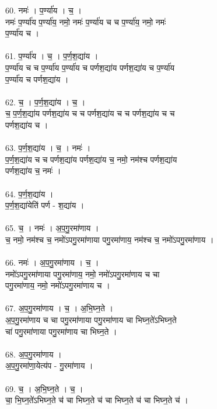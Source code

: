 60. नमः॑ । प॒र्ण्या॑य । च॒ ।\\
नमः॑ प॒र्ण्या॑य प॒र्ण्या॑य॒ नमो॒ नमः॑ प॒र्ण्या॑य च च प॒र्ण्या॑य॒ नमो॒ नमः॑\\
प॒र्ण्या॑य च ।\\
\\
61. प॒र्ण्या॑य । च॒ । प॒र्ण॒श॒द्या॑य ।\\
प॒र्ण्या॑य च च प॒र्ण्या॑य प॒र्ण्या॑य च पर्णश॒द्या॑य पर्णश॒द्या॑य च प॒र्ण्या॑य\\
प॒र्ण्या॑य च पर्णश॒द्या॑य ।\\
\\
62. च॒ । प॒र्ण॒श॒द्या॑य । च॒ ।\\
च॒ प॒र्ण॒श॒द्या॑य पर्णश॒द्या॑य च च पर्णश॒द्या॑य च च पर्णश॒द्या॑य च च\\
पर्णश॒द्या॑य च ।\\
\\
63. प॒र्ण॒श॒द्या॑य । च॒ । नमः॑ ।\\
प॒र्ण॒श॒द्या॑य च च पर्णश॒द्या॑य पर्णश॒द्या॑य च॒ नमो॒ नम॑श्च पर्णश॒द्या॑य\\
पर्णश॒द्या॑य च॒ नमः॑ ।\\
\\
64. प॒र्ण॒श॒द्या॑य ।\\
प॒र्ण॒श॒द्या॑येति॑ पर्ण - श॒द्या॑य ।\\
\\
65. च॒ । नमः॑ । अ॒प॒गु॒रमा॑णाय ।\\
च॒ नमो॒ नम॑श्च च॒ नमो॑ऽपगु॒रमा॑णाया पगु॒रमा॑णाय॒ नम॑श्च च॒ नमो॑ऽपगु॒रमा॑णाय ।\\
\\
66. नमः॑ । अ॒प॒गु॒रमा॑णाय । च॒ ।\\
नमो॑ऽपगु॒रमा॑णाया पगु॒रमा॑णाय॒ नमो॒ नमो॑ऽपगु॒रमा॑णाय च चा\\
पगु॒रमा॑णाय॒ नमो॒ नमो॑ऽपगु॒रमा॑णाय च ।\\
\\
67. अ॒प॒गु॒रमा॑णाय । च॒ । अ॒भि॒घ्न॒ते ।\\
अ॒प॒गु॒रमा॑णाय च चा पगु॒रमा॑णाया पगु॒रमा॑णाय चा भिघ्न॒ते॑ऽभिघ्न॒ते\\
चा॑ पगु॒रमा॑णाया पगु॒रमा॑णाय चा भिघ्न॒ते ।\\
\\
68. अ॒प॒गु॒रमा॑णाय ।\\
अ॒प॒गु॒रमा॑णा॒येत्य॑प - गु॒रमा॑णाय ।\\
\\
69. च॒ । अ॒भि॒घ्न॒ते । च॒ ।\\
चा॒ भि॒घ्न॒ते॑ऽभिघ्न॒ते च॑ चा भिघ्न॒ते च॑ चा भिघ्न॒ते च॑ चा भिघ्न॒ते च॑ ।\\
\\
